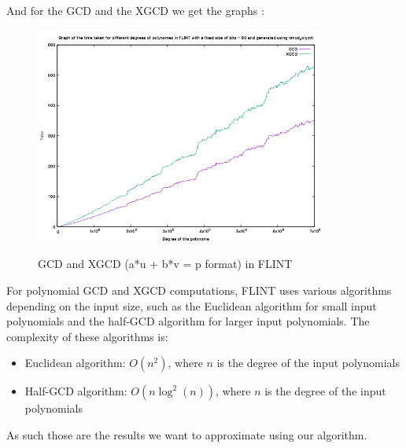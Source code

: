 And for the GCD and the XGCD we get the graphs :
\begin{figure}[H]
    \centering
    \includegraphics[width=0.85\textwidth]{figures/flint_gcd_xgcd.png}
    \label{fig2}
    \caption{GCD and XGCD (a*u + b*v = p format) in FLINT}
\end{figure}
For polynomial GCD and XGCD computations, FLINT uses various algorithms depending on the input size, such as the Euclidean algorithm for small input polynomials and the half-GCD algorithm for larger input polynomials. The complexity of these algorithms is:
\begin{itemize}
    \item Euclidean algorithm: $O(n^2)$, where $n$ is the degree of the input polynomials
    \item Half-GCD algorithm: $O(n \log^2(n))$, where $n$ is the degree of the input polynomials
\end{itemize}

\qquad As such those are the results we want to approximate using our algorithm.